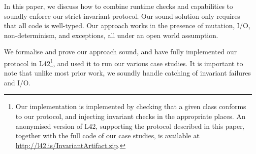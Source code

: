 In this paper, we discuss how to combine runtime checks and capabilities
to soundly enforce our strict invariant protocol.
Our sound solution only requires 
that all code is well-typed. Our approach works in the presence of mutation, I/O, non-determinism, and exceptions, all under an open world assumption.

We formalise and prove our approach sound, and have fully implemented our protocol in L42\footnote{
Our implementation is implemented by checking that a given class conforms to our protocol, and injecting invariant checks in the appropriate places.
An anonymised version of L42, supporting the protocol described in this paper, together with the full code of our case studies, is available at \url{http://l42.is/InvariantArtifact.zip}. %
}, and used it to run our various case studies.
It is important to note that unlike most prior work, we soundly handle catching of invariant failures and I/O.

